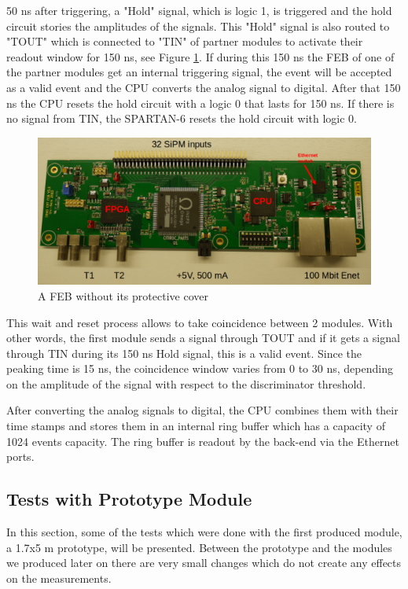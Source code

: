 \documentclass[a4paper]{article}\linespread{1.4}
\begin{document}
50 ns after triggering, a "Hold" signal, which is logic 1, is triggered and the hold circuit stories the amplitudes of the signals. This "Hold" signal is also routed to "TOUT" which is connected to "TIN" of partner modules to activate their readout window for 150 ns, see Figure \ref{fig:tout}. If during this 150 ns the FEB of one of the partner modules get an internal triggering signal, the event will be accepted as a valid event and the CPU converts the analog signal to digital. After that 150 ns the CPU resets the hold circuit with a logic 0 that lasts for 150 ns. If there is no signal from TIN, the SPARTAN-6 resets the hold circuit with logic 0. 
\begin{figure}[h!] \centering \includegraphics[width=120mm,scale=1.0]{figures/tout.png} \caption{ A FEB without its protective cover \cite{E}} \label{fig:tout} \end{figure}

This wait and reset process allows to take coincidence between 2 modules. With other words, the first module sends a signal through TOUT and if it gets a signal through TIN during its 150 ns Hold signal, this is a valid event. %
Since the peaking time is 15 ns, the coincidence window varies from 0 to 30 ns, depending on the amplitude of the signal with respect to the discriminator threshold. %

After converting the analog signals to digital, the CPU combines them with their time stamps and stores them in an internal ring buffer which has a capacity of 1024 events capacity. The ring buffer is readout by the back-end via the Ethernet ports.

\subsection{Tests with Prototype Module}
\label{chap:proto}
In this section, some of the tests which were done with the first produced module, a 1.7x5 m prototype, will be presented. Between the prototype and the modules we produced later on there are very small changes which do not create any effects on the measurements.
\end{document}
